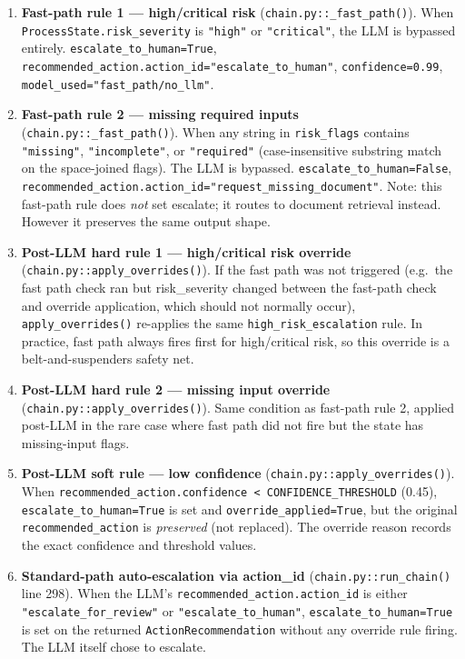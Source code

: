 \documentclass[12pt,a4paper]{article}
\begin{document}
\begin{enumerate}
  \item \textbf{Fast-path rule 1 --- high/critical risk} (\texttt{chain.py::\_fast\_path()}).
    When \texttt{ProcessState.risk\_severity} is \texttt{"high"} or \texttt{"critical"},
    the LLM is bypassed entirely. \texttt{escalate\_to\_human=True},
    \texttt{recommended\_action.action\_id="escalate\_to\_human"},
    \texttt{confidence=0.99}, \texttt{model\_used="fast\_path/no\_llm"}.

  \item \textbf{Fast-path rule 2 --- missing required inputs} (\texttt{chain.py::\_fast\_path()}).
    When any string in \texttt{risk\_flags} contains \texttt{"missing"},
    \texttt{"incomplete"}, or \texttt{"required"} (case-insensitive substring match
    on the space-joined flags). The LLM is bypassed.
    \texttt{escalate\_to\_human=False}, \texttt{recommended\_action.action\_id="request\_missing\_document"}.
    Note: this fast-path rule does \emph{not} set escalate; it routes to document
    retrieval instead. However it preserves the same output shape.

  \item \textbf{Post-LLM hard rule 1 --- high/critical risk override}
    (\texttt{chain.py::apply\_overrides()}).
    If the fast path was not triggered (e.g.\ the fast path check ran but
    risk\_severity changed between the fast-path check and override application,
    which should not normally occur), \texttt{apply\_overrides()} re-applies the
    same \texttt{high\_risk\_escalation} rule. In practice, fast path always fires first
    for high/critical risk, so this override is a belt-and-suspenders safety net.

  \item \textbf{Post-LLM hard rule 2 --- missing input override}
    (\texttt{chain.py::apply\_overrides()}).
    Same condition as fast-path rule 2, applied post-LLM in the rare case where
    fast path did not fire but the state has missing-input flags.

  \item \textbf{Post-LLM soft rule --- low confidence} (\texttt{chain.py::apply\_overrides()}).
    When \texttt{recommended\_action.confidence < CONFIDENCE\_THRESHOLD} (0.45),
    \texttt{escalate\_to\_human=True} is set and \texttt{override\_applied=True},
    but the original \texttt{recommended\_action} is \emph{preserved} (not replaced).
    The override reason records the exact confidence and threshold values.

  \item \textbf{Standard-path auto-escalation via action\_id}
    (\texttt{chain.py::run\_chain()} line 298).
    When the LLM's \texttt{recommended\_action.action\_id} is either
    \texttt{"escalate\_for\_review"} or \texttt{"escalate\_to\_human"},
    \texttt{escalate\_to\_human=True} is set on the returned \texttt{ActionRecommendation}
    without any override rule firing. The LLM itself chose to escalate.
\end{enumerate}
\end{document}

